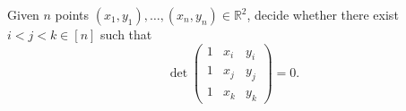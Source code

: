 \begin{problem}
	Given \(n\) points \((x_1,y_1), \ldots, (x_n,y_n) \in \mathbb{R}^2\), decide
	whether there exist \(i < j < k \in [n]\) such that
	\begin{displaymath}
		\det
		\left(
		\begin{matrix}
		1 & x_i & y_i \\
		1 & x_j & y_j \\
		1 & x_k & y_k
		\end{matrix}
		\right)
		= 0.
	\end{displaymath}
\end{problem}
